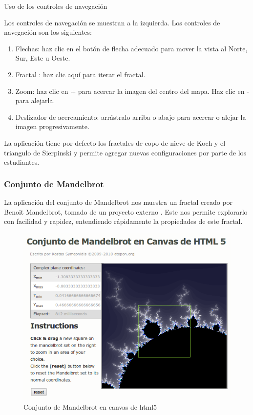 \documentclass[letterpaper, 11pt, oneside]{article}
\theoremstyle{definition}
\theoremstyle{remark}
\begin{document}
Uso de los controles de navegación

Los controles de navegación se muestran a la izquierda. Los controles de navegación son los siguientes:
\begin{enumerate}
 \item Flechas: haz clic en el botón de flecha adecuado para mover la vista al Norte, Sur, Este u Oeste.
 \item Fractal : haz clic aquí para iterar el fractal.
 \item Zoom: haz clic en + para acercar la imagen del centro del mapa. Haz clic en - para alejarla.
 \item Deslizador de acercamiento: arrástralo arriba o abajo para acercar o alejar la imagen progresivamente.
\end{enumerate}

La aplicación tiene por defecto los fractales de copo de nieve de Koch y el triangulo de Sierpinski y permite agregar nuevas configuraciones por parte de los estudiantes.
\clearpage
\newpage
\subsubsection{Conjunto de Mandelbrot} 
La aplicación del conjunto de Mandelbrot nos muestra un fractal creado por  Benoit Mandelbrot, tomado de un proyecto externo \cite{CanvasMandelbrot}. Este nos permite explorarlo con facilidad y rapidez, entendiendo rápidamente la propiedades de este fractal.

\begin{figure}[h]
\includegraphics[width=15cm,clip]{Imagenes/mandelbrot.png}
\caption{Conjunto de Mandelbrot en canvas de html5}
\label{mandelbrot_canvas}
\end{figure}
\end{document}
